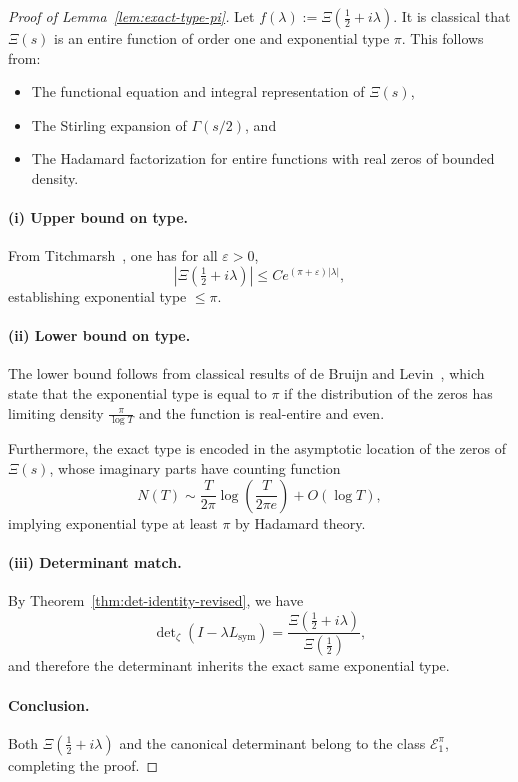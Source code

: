 \begin{proof}[Proof of Lemma~\ref{lem:exact-type-pi}]
Let \( f(\lambda) := \Xi\left( \tfrac{1}{2} + i\lambda \right) \). It is classical that \( \Xi(s) \) is an entire function of order one and exponential type \( \pi \). This follows from:

\begin{itemize}
  \item The functional equation and integral representation of \( \Xi(s) \),
  \item The Stirling expansion of \( \Gamma(s/2) \), and
  \item The Hadamard factorization for entire functions with real zeros of bounded density.
\end{itemize}

\paragraph{(i) Upper bound on type.}
From Titchmarsh~\cite[§10.5]{Titchmarsh1986Zeta}, one has for all \( \varepsilon > 0 \),
\[
|\Xi(\tfrac{1}{2} + i\lambda)| \le C e^{(\pi + \varepsilon)|\lambda|},
\]
establishing exponential type \( \le \pi \).

\paragraph{(ii) Lower bound on type.}
The lower bound follows from classical results of de Bruijn and Levin~\cite[Chap.~3]{Levin1996EntireLectures}, which state that the exponential type is equal to \( \pi \) if the distribution of the zeros has limiting density \( \frac{\pi}{\log T} \) and the function is real-entire and even.

Furthermore, the exact type is encoded in the asymptotic location of the zeros of \( \Xi(s) \), whose imaginary parts have counting function
\[
N(T) \sim \frac{T}{2\pi} \log\left(\frac{T}{2\pi e}\right) + O(\log T),
\]
implying exponential type at least \( \pi \) by Hadamard theory.

\paragraph{(iii) Determinant match.}
By Theorem~\ref{thm:det-identity-revised}, we have
\[
\det\nolimits_\zeta(I - \lambda L_{\mathrm{sym}}) = \frac{\Xi(\tfrac{1}{2} + i\lambda)}{\Xi(\tfrac{1}{2})},
\]
and therefore the determinant inherits the exact same exponential type.

\paragraph{Conclusion.}
Both \( \Xi(\tfrac{1}{2} + i\lambda) \) and the canonical determinant belong to the class \( \mathcal{E}_1^\pi \), completing the proof.
\end{proof}
%  